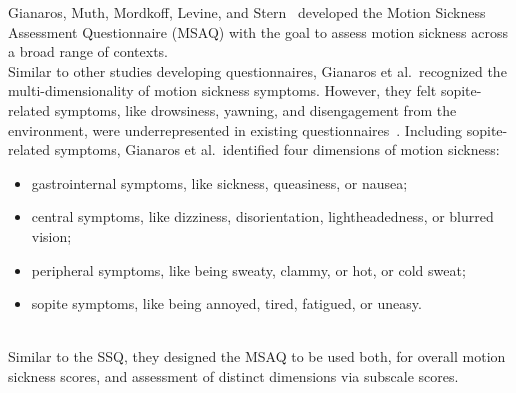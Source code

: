 Gianaros, Muth, Mordkoff, Levine, and Stern~\cite{Gianaros2001} developed the Motion Sickness Assessment
Questionnaire (MSAQ) with the goal to assess motion sickness across a broad range of contexts.
\\
Similar to other studies developing questionnaires, Gianaros et al.\ recognized the multi-dimensionality of motion
sickness symptoms.
However, they felt sopite-related symptoms, like drowsiness, yawning, and disengagement from the environment, were
underrepresented in existing questionnaires~\cite{Gianaros2001,Graybiel1976}.
Including sopite-related symptoms, Gianaros et al.\ identified four dimensions of motion sickness:
\begin{itemize}
    \item gastrointernal symptoms, like sickness, queasiness, or nausea;
    \item central symptoms, like dizziness, disorientation, lightheadedness, or blurred vision;
    \item peripheral symptoms, like being sweaty, clammy, or hot, or cold sweat;
    \item sopite symptoms, like being annoyed, tired, fatigued, or uneasy.
\end{itemize}
\\
Similar to the SSQ, they designed the MSAQ to be used both, for overall motion sickness scores, and assessment of 
distinct dimensions via subscale scores.
